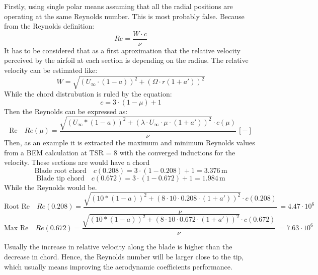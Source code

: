 Firstly, using single polar means assuming that all the radial positions are operating at the same Reynolds number. This is most probably false. Because from the Reynolds definition:
\begin{equation}
Re = \frac{ W \cdot c}{\nu}
\end{equation}
It has to be considered that as a first aproximation that the relative velocity perceived by the airfoil at each section is depending on the radius. The relative velocity can be estimated like:
\begin{equation}
W = \sqrt{(U_\infty \cdot (1-a) )^2 + (\Omega \cdot r (1+a'))^2}
\end{equation}
While the chord distrubution is ruled by the equation:
\begin{equation}
c = 3 \cdot (1-\mu) + 1 
\end{equation}
Then the Reynolds can be expressed as:
\begin{equation}
\text{Re} \quad Re(\mu)=\frac{\sqrt{(U_\infty*(1-a))^2 + (\lambda \cdot U_\infty \cdot \mu \cdot (1+a'))^2} \cdot c(\mu) } {\nu}\, [-]
\end{equation}
Then, as an example it is extracted the maximum and minimum Reynolds values from a BEM calculation at TSR = 8 with the converged inductions for the velocity. These sections are would have a chord
\begin{equation}
\text{Blade root chord} \quad c(0.208)=3 \cdot (1-0.208)+1=3.376 \, \text{m}
\end{equation}
\begin{equation}
\text{Blade tip chord} \quad  c(0.672)=3 \cdot (1-0.672)+1= 1.984 \, \text{m}
\end{equation}
While the Reynolds would be.
\begin{equation}
\text{Root Re} \quad Re(0.208)= \frac{\sqrt{(10*(1-a))^2 + (8 \cdot 10 \cdot 0.208 \cdot (1+a'))^2} \cdot c (0.208) } {\nu} \, = 4.47 \cdot 10^6
\end{equation}
\begin{equation}
\text{Max Re} \quad Re(0.672)= \frac{\sqrt{(10*(1-a))^2 + (8 \cdot 10 \cdot 0.672 \cdot (1+a'))^2} \cdot c (0.672) } {\nu} \, = 7.63 \cdot 10^6
\end{equation}

Usually the increase in relative velocity along the blade is higher than the decrease in chord. Hence, the Reynolds number will be larger close to the tip, which usually means improving the aerodynamic coefficients performance.  \\


